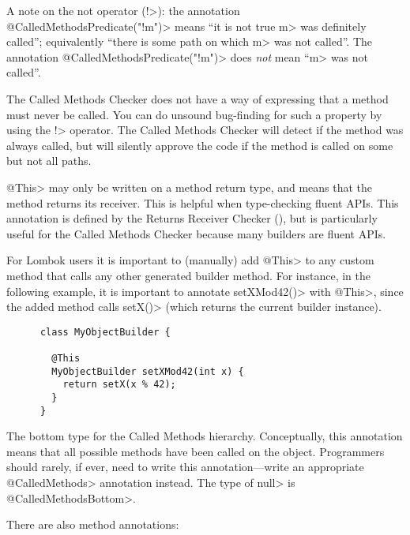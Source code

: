 \begin{description}
  A note on the not operator (\<!>): the annotation
  \<@CalledMethodsPredicate("!m")> means ``it is not true \<m> was
  definitely called''; equivalently ``there is some path on which \<m> was
  not called''.  The annotation \<@CalledMethodsPredicate("!m")> does
  \emph{not} mean ``\<m> was not called''.

  The Called Methods Checker does not have a way of expressing that a
  method must never be called.  You can do unsound bug-finding for such a
  property by using the \<!> operator.  The Called Methods Checker will
  detect if the method was always called, but will silently approve the code
  if the method is called on some but not all paths.

\item[\refqualclass{common/returnsreceiver/qual}{This}]
  \<@This> may only be written on a method return type, and means that the method returns its receiver.
  This is helpful when type-checking fluent APIs. This annotation is defined by the
  Returns Receiver Checker (), but is particularly useful
  for the Called Methods Checker because many builders are fluent APIs.

  For Lombok users it is important to (manually) add \<@This> to any custom method that calls any other
  generated builder method. For instance, in the following example, it is important to annotate
  \<setXMod42()> with \<@This>, since the added method calls \<setX()> (which returns the current builder
  instance).

  \begin{Verbatim}
      class MyObjectBuilder {

        @This
        MyObjectBuilder setXMod42(int x) {
          return setX(x % 42);
        }
      }
  \end{Verbatim}

\item[\refqualclass{checker/calledmethods/qual}{CalledMethodsBottom}]
  The bottom type for the Called Methods hierarchy. Conceptually, this annotation
  means that all possible methods have been called on the object. Programmers should rarely,
  if ever, need to write this annotation---write an appropriate \<@CalledMethods> annotation
  instead. The type of \<null> is \<@CalledMethodsBottom>.

\end{description}

There are also method annotations:

